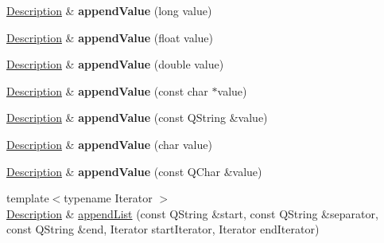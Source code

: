 \begin{DoxyCompactItemize}
\item 
\hypertarget{class_hamcrest_qt_1_1_description_ad3194a1f9cb19c7ded63a9f4137a7a4f}{\hyperlink{class_hamcrest_qt_1_1_description}{Description} \& {\bfseries append\-Value} (long value)}\label{class_hamcrest_qt_1_1_description_ad3194a1f9cb19c7ded63a9f4137a7a4f}

\item 
\hypertarget{class_hamcrest_qt_1_1_description_a913cb1bed8a73253afb5277fa9057823}{\hyperlink{class_hamcrest_qt_1_1_description}{Description} \& {\bfseries append\-Value} (float value)}\label{class_hamcrest_qt_1_1_description_a913cb1bed8a73253afb5277fa9057823}

\item 
\hypertarget{class_hamcrest_qt_1_1_description_aac6bd98a42370398372e574f99d2dfa1}{\hyperlink{class_hamcrest_qt_1_1_description}{Description} \& {\bfseries append\-Value} (double value)}\label{class_hamcrest_qt_1_1_description_aac6bd98a42370398372e574f99d2dfa1}

\item 
\hypertarget{class_hamcrest_qt_1_1_description_a97cbeccfaf86284a12f7411194e627f3}{\hyperlink{class_hamcrest_qt_1_1_description}{Description} \& {\bfseries append\-Value} (const char $\ast$value)}\label{class_hamcrest_qt_1_1_description_a97cbeccfaf86284a12f7411194e627f3}

\item 
\hypertarget{class_hamcrest_qt_1_1_description_a3021527892a3d95ae5c060a758a39d5e}{\hyperlink{class_hamcrest_qt_1_1_description}{Description} \& {\bfseries append\-Value} (const Q\-String \&value)}\label{class_hamcrest_qt_1_1_description_a3021527892a3d95ae5c060a758a39d5e}

\item 
\hypertarget{class_hamcrest_qt_1_1_description_a1509fac2374ef729fc5e84dd37c43dc1}{\hyperlink{class_hamcrest_qt_1_1_description}{Description} \& {\bfseries append\-Value} (char value)}\label{class_hamcrest_qt_1_1_description_a1509fac2374ef729fc5e84dd37c43dc1}

\item 
\hypertarget{class_hamcrest_qt_1_1_description_a0df92a24ec9f68a7a711ef381fe9bb7a}{\hyperlink{class_hamcrest_qt_1_1_description}{Description} \& {\bfseries append\-Value} (const Q\-Char \&value)}\label{class_hamcrest_qt_1_1_description_a0df92a24ec9f68a7a711ef381fe9bb7a}

\item 
\hypertarget{class_hamcrest_qt_1_1_description_a7bb11eef4483ba18cdee9d04e8d6fdd7}{{\footnotesize template$<$typename Iterator $>$ }\\\hyperlink{class_hamcrest_qt_1_1_description}{Description} \& \hyperlink{class_hamcrest_qt_1_1_description_a7bb11eef4483ba18cdee9d04e8d6fdd7}{append\-List} (const Q\-String \&start, const Q\-String \&separator, const Q\-String \&end, Iterator start\-Iterator, Iterator end\-Iterator)}\label{class_hamcrest_qt_1_1_description_a7bb11eef4483ba18cdee9d04e8d6fdd7}


\end{DoxyCompactItemize}
